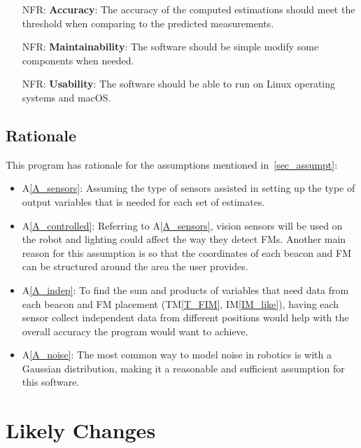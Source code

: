 \documentclass[12pt]{article}
\newcommand{\tref}[1]{TM\ref{#1}}
\newcommand{\aref}[1]{A\ref{#1}}
\newcommand{\iref}[1]{IM\ref{#1}}
\newcounter{nfrnum} %
\begin{document}
\noindent \begin{itemize}

\item[NFR\refstepcounter{nfrnum}\thenfrnum \label{NFR_Accuracy}:]
  \textbf{Accuracy}: The accuracy of the computed estimations should meet the threshold when comparing to the predicted measurements. 

\item[NFR\refstepcounter{nfrnum}\thenfrnum \label{NFR_Maintainability}:]
  \textbf{Maintainability}: The software should be simple modify some components when needed.

\item[NFR\refstepcounter{nfrnum}\thenfrnum \label{NFR_Reusability}:]
  \textbf{Usability}: The software should be able to run on Linux operating systems and macOS.
\end{itemize}

\subsection{Rationale}

This program has rationale for the assumptions mentioned in~\ref{sec_assumpt}:
\begin{itemize}
  \item \aref{A_sensors}: Assuming the type of sensors assisted in setting up the type of output variables that is needed for each set of estimates.
  \item \aref{A_controlled}: Referring to \aref{A_sensors}, vision sensors will be used on the robot and lighting could affect the way they detect FMs. Another main reason for this assumption is so that the coordinates of each beacon and FM can be structured around the area the user provides.
  \item \aref{A_indep}: To find the sum and products of variables that need data from each beacon and FM placement (\tref{T_FIM}, \iref{IM_like}), having each sensor collect independent data from different positions would help with the overall accuracy the program would want to achieve.
  \item \aref{A_noise}: The most common way to model noise in robotics is with a Gaussian distribution, making it a reasonable and sufficient assumption for this software.
\end{itemize}

\section{Likely Changes}    
\end{document}
